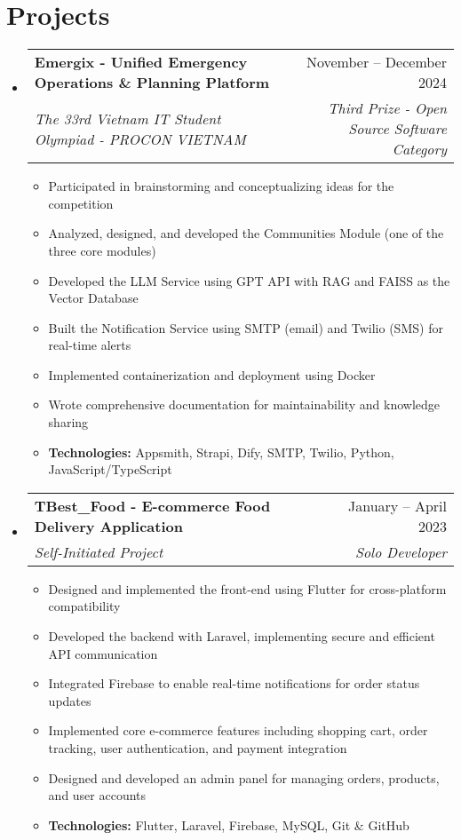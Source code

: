 \documentclass[letterpaper,11pt]{article}
\makeatletter
\newcommand{\resumeItem}[1]{
  \item\small{
    {#1 \vspace{-2pt}}
  }
}
\newcommand{\resumeSubheading}[4]{
  \vspace{-2pt}\item
    \begin{tabular*}{0.97\textwidth}[t]{l@{\extracolsep{\fill}}r}
      \textbf{#1} & #2 \\
      \textit{\small#3} & \textit{\small #4} \\
    \end{tabular*}\vspace{-7pt}
}
\newcommand{\resumeSubHeadingListStart}{\begin{itemize}[leftmargin=0.15in, label={}]}
\newcommand{\resumeSubHeadingListEnd}{\end{itemize}}
\newcommand{\resumeItemListStart}{\begin{itemize}}
\newcommand{\resumeItemListEnd}{\end{itemize}\vspace{-5pt}}
\makeatother
\begin{document}
\section{Projects}
  \resumeSubHeadingListStart
    \resumeSubheading
      {Emergix - Unified Emergency Operations \& Planning Platform}{November -- December 2024}
      {The 33rd Vietnam IT Student Olympiad - PROCON VIETNAM}{Third Prize - Open Source Software Category}
      \resumeItemListStart
        \resumeItem{Participated in brainstorming and conceptualizing ideas for the competition}
        \resumeItem{Analyzed, designed, and developed the Communities Module (one of the three core modules)}
        \resumeItem{Developed the LLM Service using GPT API with RAG and FAISS as the Vector Database}
        \resumeItem{Built the Notification Service using SMTP (email) and Twilio (SMS) for real-time alerts}
        \resumeItem{Implemented containerization and deployment using Docker}
        \resumeItem{Wrote comprehensive documentation for maintainability and knowledge sharing}
        \resumeItem{\textbf{Technologies:} Appsmith, Strapi, Dify, SMTP, Twilio, Python, JavaScript/TypeScript}
      \resumeItemListEnd
      
    \resumeSubheading
      {TBest\_Food - E-commerce Food Delivery Application}{January -- April 2023}
      {Self-Initiated Project}{Solo Developer}
      \resumeItemListStart
        \resumeItem{Designed and implemented the front-end using Flutter for cross-platform compatibility}
        \resumeItem{Developed the backend with Laravel, implementing secure and efficient API communication}
        \resumeItem{Integrated Firebase to enable real-time notifications for order status updates}
        \resumeItem{Implemented core e-commerce features including shopping cart, order tracking, user authentication, and payment integration}
        \resumeItem{Designed and developed an admin panel for managing orders, products, and user accounts}
        \resumeItem{\textbf{Technologies:} Flutter, Laravel, Firebase, MySQL, Git \& GitHub}
      \resumeItemListEnd
  \resumeSubHeadingListEnd

\end{document}
